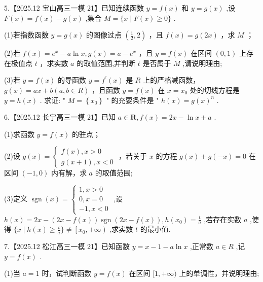 \documentclass[10pt]{article}
\begin{document}
5.【2025.12 宝山高三一模 21】已知连续函数 \(y = f\left( x\right)\) 和 \(y = g\left( x\right)\) ,设 \(F\left( x\right)  = f\left( x\right)  - g\left( x\right)\) ,集合 \(M = \{ x \mid  F\left( x\right)  \geq  0\}\) .

(1)若指数函数 \(y = g\left( x\right)\) 的图像过点 \(\left( {\frac{1}{2},2}\right)\) ，且 \(f\left( x\right)  = g\left( {2x}\right)\) ，求 \(M\) ；

(2)若 \(f\left( x\right)  = {e}^{x} - a\ln x,g\left( x\right)  = a - {e}^{x}\) ，且 \(y = f\left( x\right)\) 在区间 \(\left( {0,1}\right)\) 上存在极值点 \(t\) ，求实数 \(a\) 的取值范围,并判断 \(t\) 是否属于 \(M\) ,请说明理由;

(3)若 \(y = f\left( x\right)\) 的导函数 \(y = {f}^{\prime }\left( x\right)\) 是 \(R\) 上的严格减函数， \(g\left( x\right)  = {ax} + b\left( {a,b \in  R}\right)\) ，且函数 \(y = f\left( x\right)\) 在 \(x = {x}_{0}\) 处的切线方程是 \(y = h\left( x\right)\) . 求证: " \(M = \left\{  {x}_{0}\right\}\) " 的充要条件是 " \(h\left( x\right)  = g{\left( x\right) }^{n}\) .

6.【2025.12 长宁高三一模 21】已知 \(a \in  \mathbf{R},f\left( x\right)  = {2x} - \ln x + a\) .

(1)求函数 \(y = f\left( x\right)\) 的驻点；

(2)设 \(g\left( x\right)  = \left\{  \begin{array}{l} f\left( x\right) ,x > 0 \\  g\left( {x + 1}\right) ,x < 0 \end{array}\right.\) ，若关于 \(x\) 的方程 \(g\left( x\right)  + g\left( {-x}\right)  = 0\) 在区间 \(\left( {-1,0}\right)\) 内有解，求 \(a\) 的取值范围;

(3)定义 \(\operatorname{sgn}\left( x\right)  = \left\{  \begin{array}{l} 1,x > 0 \\  0,x = 0 \\   - 1,x < 0 \end{array}\right.\) ,设 \(h\left( x\right)  = {2x} - \left( {{2x} - f\left( x\right) }\right) \operatorname{sgn}\left( {{2x} - f\left( x\right) }\right) ,h\left( {x}_{0}\right)  = \frac{t}{a}\) ,若存在实数 \(a\) ,使得 \(\{ x \mid  h\left( x\right)  \geq  \frac{t}{a}\}  \neq  \left\lbrack  {{x}_{0}, + \infty }\right)\) ,求实数 \(t\) 的最小值.

7.【2025.12 松江高三一模 21】已知函数 \(y = x - 1 - a\ln x\) ,正常数 \(a \in  R\) ,记 \(y = f\left( x\right)\) .

(1)当 \(a = 1\) 时，试判断函数 \(y = f\left( x\right)\) 在区间 \(\lbrack 1, + \infty )\) 上的单调性，并说明理由;
\end{document}
